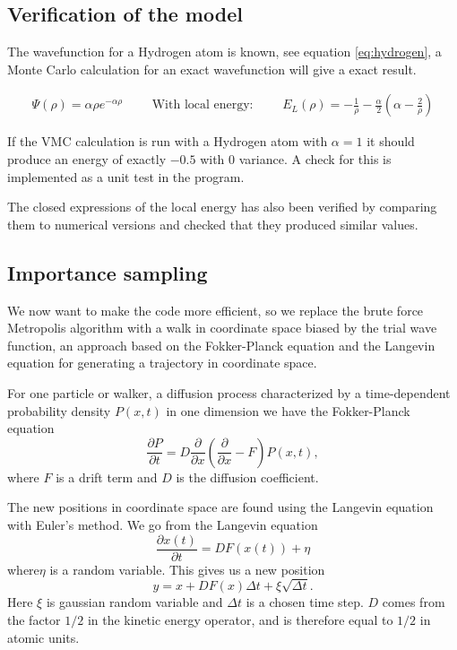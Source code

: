 \documentclass[11pt]{article}
\begin{document}
		\subsection{Verification of the model}
			The wavefunction for a Hydrogen atom is known, see equation \eqref{eq:hydrogen}, a Monte Carlo calculation for an exact wavefunction will give a exact result.

			\begin{align}
			 \Psi(\rho ) = \alpha \rho e^{-\alpha\rho} \qquad \text{ With  local energy: } \qquad E_{L} (\rho) = - \frac{1}{\rho} - \frac{\alpha}{2} \left( \alpha - \frac{2}{\rho} \right) \label{eq:hydrogen}
			\end{align}

			If the VMC calculation is run with a Hydrogen atom with \(\alpha = 1\) it should produce an energy of exactly \( -0.5\) with \(0\) variance. A check for this is implemented as a unit test in the program.

			The closed expressions of the local energy has also been verified by comparing them to numerical versions and checked that they produced similar values.


\subsection{Importance sampling}

We now want to make the code more efficient, so we replace the brute
force Metropolis algorithm with a walk in coordinate space biased
by the trial wave function, an approach based on the Fokker-Planck
equation and the Langevin equation for generating a trajectory in
coordinate space. 

For one particle or walker, a diffusion process characterized by a
time-dependent probability density $P\left(x,t\right)$ in one dimension
we have the Fokker-Planck equation
\[
\frac{\partial P}{\partial t}=D\frac{\partial}{\partial x}\left(\frac{\partial}{\partial x}-F\right)P\left(x,t\right),
\]
where $F$ is a drift term and $D$ is the diffusion coefficient. 

The new positions in coordinate space are found using the Langevin
equation with Euler's method. We go from the Langevin equation
\[
\frac{\partial x(t)}{\partial t}=DF(x(t))+\eta
\]
where$\eta$ is a random variable. This gives us a new position
\[
y=x+DF(x)\Delta t+\xi\sqrt{\Delta t}.
\]
Here $\xi$ is gaussian random variable and $\Delta t$ is a chosen
time step. $D$ comes from the factor $1/2$ in the kinetic energy
operator, and is therefore equal to $1/2$ in atomic units.
\end{document}
